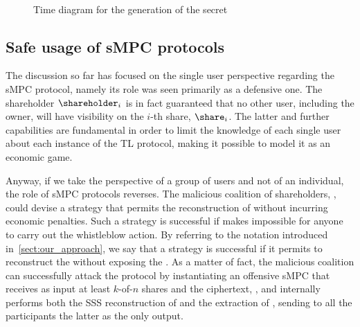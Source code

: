 \begin{figure}[t]
	\centering
	\\
	\caption{Time diagram for the generation of the secret}%
	\label{fig:sigmatime}%
\end{figure}


\subsection{Safe usage of sMPC protocols}\label{sect:impl_mpc}


The discussion so far has focused on the single user perspective regarding the sMPC protocol, namely its role was seen primarily as a defensive one. The shareholder $\shareholder_{i}$ is in fact guaranteed that no other user, including the owner, will have visibility on the $i$-th share, $\share_{i}$. The latter and further capabilities are fundamental in order to limit the knowledge of each single user about each instance of the TL protocol, making it possible to model it as an economic game. 

Anyway, if we take the perspective of a group of users and not of an individual, the role of sMPC protocols reverses. The malicious coalition of shareholders, \coalition, could devise a strategy that permits the reconstruction of \secret without incurring economic penalties. 
Such a strategy is successful if makes impossible for anyone to carry out the whistleblow action. By referring to the notation introduced in~\ref{sect:our_approach}, we say that a strategy is successful if it permits to reconstruct the \plaintext without exposing the \key. 
As a matter of fact, the malicious coalition can successfully attack the protocol by instantiating an offensive sMPC that receives as input at least $k$-of-$n$ shares and the ciphertext, \ciphertext, and internally performs both the SSS reconstruction of \key and the extraction \unwrap of \plaintext, sending to all the participants the latter as the only output. 

